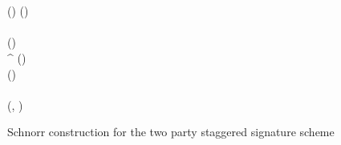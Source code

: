 \begin{figure}[tb]
\begin{center}
{\begin{varwidth}{\textwidth}
{            \varSchnorrChallenge \opAssign \funHash{\varMsg \opConc \varRand \opConc \varPubKey} \< \< \varSchnorrChallenge \opAssign \funHash{\varMsg \opConc \varRand \opConc \varPubKey} \\
            \varSAlice \opAssign \varNonceAlice \opAddScalar \varSecKeyAlice \opTimesScalar \varSchnorrChallenge \< \< \varSBob \opAssign \varNonceBob \opAddScalar \varSecKeyBob \opTimesScalar \varSchnorrChallenge \\
            \varSigAlice \opAssign (\varSAlice \opSeperate \varSchnorrChallenge \opSeperate \varRandAlice ) \< \< \varSigBob \opAssign (\varSBob \opSeperate \varSchnorrChallenge \opSeperate \varRandBob) \\
            \pcreturn \varSigAlice \< \< \pcreturn \varSigBob 
            } \\
            \procedure[linenumbering]{$\procVerfPtSig{\varSig}{\varMsg}{\varPubKeyOneSide}{}$} {
            (\varSOneSide \opSeperate \varSchnorrChallenge \opSeperate \varRandOneSide) \opFunResult \varSig \\
            \pcreturn \funGen{\varSOneSide} \opEq \varRandOneSide \opAddPoint \varPubKeyOneSide^{\varSchnorrChallenge}
            }
            \procedure[linenumbering]{$\procFinSig{\varSigAlice}{\varSigBob}$} {
            (\varSAlice \opSeperate \varSchnorrChallenge \opSeperate \varRandAlice) \opFunResult \varSigAlice \\
            (\varSBob \opSeperate \varSchnorrChallenge \opSeperate \varRandBob) \opFunResult \varSigBob \\
            \varS \opAssign \varSAlice \opAddScalar \varSBob \\
            \varSigFin \opAssign (\varS, \varSchnorrChallenge) \\
            \pcreturn \varSigFin
            }
        \end{varwidth}
        }
    \end{center}
    \caption{Schnorr construction for the two party staggered signature scheme}
    \label{fig:twoparty-schnorr}
\end{figure}


